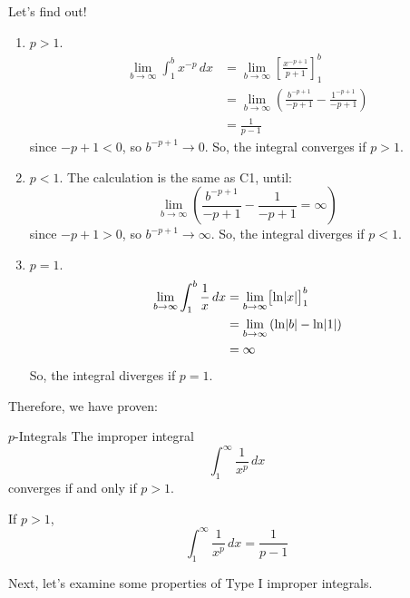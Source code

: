 Let's find out!
\begin{enumerate}[label=C\arabic*]
    \item $ p>1 $.
          \begin{align*}
              \lim\limits_{{b} \to {\infty}} \int_{1}^{b} x^{-p}\, d{x}
               & = \lim\limits_{{b} \to {\infty}} \left[\frac{x^{-p+1}}{p+1}  \right]_{1}^b \\
               & =\lim\limits_{{b} \to {\infty}} \left( \frac{b^{-p+1}}{-p+1}-
              \frac{1^{-p+1}}{-p+1}  \right)                                                \\
               & =\frac{1}{p-1}
          \end{align*}
          since $ -p+1<0 $, so $ b^{-p+1}\to 0 $. So, the integral converges if $ p>1 $.
    \item $ p<1 $. The calculation is the same as C1, until:
          \[ \lim\limits_{{b} \to {\infty}} \left( \frac{b^{-p+1}}{-p+1} -\frac{1}{-p+1} =\infty \right) \]
          since $ -p+1>0 $, so $ b^{-p+1}\to\infty $. So, the integral diverges if $ p<1 $.
    \item $ p=1 $.
          \begin{align*}
              \lim\limits_{{b} \to {\infty}} \int_{1}^{b} \frac{1}{x} \, d{x}
               & =\lim\limits_{{b} \to {\infty}} \bigl[\ln\lvert x\rvert\bigr]_{1}^b         \\
               & =\lim\limits_{{b} \to {\infty}} \left( \ln\lvert b\rvert-\ln\lvert1\rvert \right) \\
               & =\infty
          \end{align*}
          So, the integral diverges if $ p=1 $.
\end{enumerate}
Therefore, we have proven:

\begin{Theorem}{$p$-Integrals}{}
    The improper integral
    \[ \int_{1}^{\infty} \frac{1}{x^p} \, d{x} \]
    converges if and only if $ p>1 $.

    If $ p>1 $,
    \[ \int_{1}^{\infty} \frac{1}{x^p} \, d{x} =\frac{1}{p-1} \]
\end{Theorem}

Next, let's examine some properties of Type I improper integrals.

